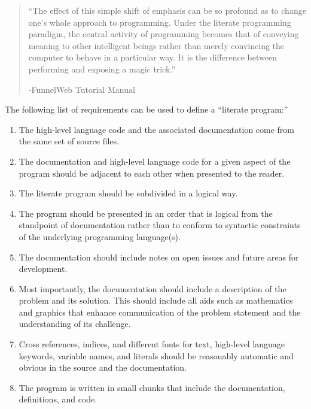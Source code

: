 \begin{quote}
``The effect of this simple shift of emphasis can be so profound as to change one's whole approach to
programming. Under the literate programming paradigm, the central activity of programming becomes that of 
conveying meaning to other intelligent beings rather than merely convincing the computer to behave in a 
particular way. It is the difference between performing and exposing a magic trick.'' 
\begin{flushright}
-FunnelWeb Tutorial Manual\cite{funnelweb-what-is-literate-programming}
\end{flushright}
\end{quote}

\label{literate-program-requirements}
The following list of requirements can be used to define a ``literate program:''\cite{childs}
\begin{enumerate}
\item The high-level language code and the associated documentation come from the same 
set of source files.
\item The documentation and high-level language code for a given aspect of the program should be 
adjacent to each other when presented to the reader.
\item The literate program should be subdivided in a logical way.
\item The program should be presented in an order that is logical from the standpoint of documentation
rather than to conform to syntactic constraints of the underlying programming language(s).
\item The documentation should include notes on open issues and future areas for development.
\item Most importantly, the documentation should include a description of the problem and its solution. 
This should include all aids such as mathematics and graphics that enhance communication of the problem 
statement and the understanding of its challenge.
\item Cross references, indices, and different fonts for text, high-level language keywords, 
variable names, and literals should be reasonably automatic and obvious in the source and the documentation.
\item The program is written in small chunks that include the documentation, definitions, and code.
\end{enumerate}

